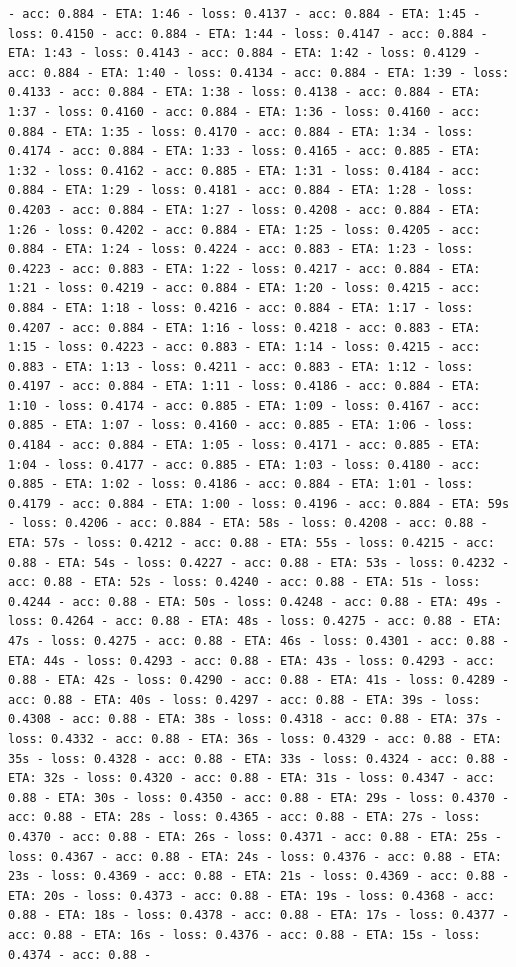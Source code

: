 \documentclass[11pt]{article}
\begin{document}
\begin{Verbatim}[commandchars=\\\{\}]
- acc: 0.884 - ETA: 1:46 - loss: 0.4137 - acc: 0.884 - ETA: 1:45 - loss: 0.4150 - acc: 0.884 - ETA: 1:44 - loss: 0.4147 - acc: 0.884 - ETA: 1:43 - loss: 0.4143 - acc: 0.884 - ETA: 1:42 - loss: 0.4129 - acc: 0.884 - ETA: 1:40 - loss: 0.4134 - acc: 0.884 - ETA: 1:39 - loss: 0.4133 - acc: 0.884 - ETA: 1:38 - loss: 0.4138 - acc: 0.884 - ETA: 1:37 - loss: 0.4160 - acc: 0.884 - ETA: 1:36 - loss: 0.4160 - acc: 0.884 - ETA: 1:35 - loss: 0.4170 - acc: 0.884 - ETA: 1:34 - loss: 0.4174 - acc: 0.884 - ETA: 1:33 - loss: 0.4165 - acc: 0.885 - ETA: 1:32 - loss: 0.4162 - acc: 0.885 - ETA: 1:31 - loss: 0.4184 - acc: 0.884 - ETA: 1:29 - loss: 0.4181 - acc: 0.884 - ETA: 1:28 - loss: 0.4203 - acc: 0.884 - ETA: 1:27 - loss: 0.4208 - acc: 0.884 - ETA: 1:26 - loss: 0.4202 - acc: 0.884 - ETA: 1:25 - loss: 0.4205 - acc: 0.884 - ETA: 1:24 - loss: 0.4224 - acc: 0.883 - ETA: 1:23 - loss: 0.4223 - acc: 0.883 - ETA: 1:22 - loss: 0.4217 - acc: 0.884 - ETA: 1:21 - loss: 0.4219 - acc: 0.884 - ETA: 1:20 - loss: 0.4215 - acc: 0.884 - ETA: 1:18 - loss: 0.4216 - acc: 0.884 - ETA: 1:17 - loss: 0.4207 - acc: 0.884 - ETA: 1:16 - loss: 0.4218 - acc: 0.883 - ETA: 1:15 - loss: 0.4223 - acc: 0.883 - ETA: 1:14 - loss: 0.4215 - acc: 0.883 - ETA: 1:13 - loss: 0.4211 - acc: 0.883 - ETA: 1:12 - loss: 0.4197 - acc: 0.884 - ETA: 1:11 - loss: 0.4186 - acc: 0.884 - ETA: 1:10 - loss: 0.4174 - acc: 0.885 - ETA: 1:09 - loss: 0.4167 - acc: 0.885 - ETA: 1:07 - loss: 0.4160 - acc: 0.885 - ETA: 1:06 - loss: 0.4184 - acc: 0.884 - ETA: 1:05 - loss: 0.4171 - acc: 0.885 - ETA: 1:04 - loss: 0.4177 - acc: 0.885 - ETA: 1:03 - loss: 0.4180 - acc: 0.885 - ETA: 1:02 - loss: 0.4186 - acc: 0.884 - ETA: 1:01 - loss: 0.4179 - acc: 0.884 - ETA: 1:00 - loss: 0.4196 - acc: 0.884 - ETA: 59s - loss: 0.4206 - acc: 0.884 - ETA: 58s - loss: 0.4208 - acc: 0.88 - ETA: 57s - loss: 0.4212 - acc: 0.88 - ETA: 55s - loss: 0.4215 - acc: 0.88 - ETA: 54s - loss: 0.4227 - acc: 0.88 - ETA: 53s - loss: 0.4232 - acc: 0.88 - ETA: 52s - loss: 0.4240 - acc: 0.88 - ETA: 51s - loss: 0.4244 - acc: 0.88 - ETA: 50s - loss: 0.4248 - acc: 0.88 - ETA: 49s - loss: 0.4264 - acc: 0.88 - ETA: 48s - loss: 0.4275 - acc: 0.88 - ETA: 47s - loss: 0.4275 - acc: 0.88 - ETA: 46s - loss: 0.4301 - acc: 0.88 - ETA: 44s - loss: 0.4293 - acc: 0.88 - ETA: 43s - loss: 0.4293 - acc: 0.88 - ETA: 42s - loss: 0.4290 - acc: 0.88 - ETA: 41s - loss: 0.4289 - acc: 0.88 - ETA: 40s - loss: 0.4297 - acc: 0.88 - ETA: 39s - loss: 0.4308 - acc: 0.88 - ETA: 38s - loss: 0.4318 - acc: 0.88 - ETA: 37s - loss: 0.4332 - acc: 0.88 - ETA: 36s - loss: 0.4329 - acc: 0.88 - ETA: 35s - loss: 0.4328 - acc: 0.88 - ETA: 33s - loss: 0.4324 - acc: 0.88 - ETA: 32s - loss: 0.4320 - acc: 0.88 - ETA: 31s - loss: 0.4347 - acc: 0.88 - ETA: 30s - loss: 0.4350 - acc: 0.88 - ETA: 29s - loss: 0.4370 - acc: 0.88 - ETA: 28s - loss: 0.4365 - acc: 0.88 - ETA: 27s - loss: 0.4370 - acc: 0.88 - ETA: 26s - loss: 0.4371 - acc: 0.88 - ETA: 25s - loss: 0.4367 - acc: 0.88 - ETA: 24s - loss: 0.4376 - acc: 0.88 - ETA: 23s - loss: 0.4369 - acc: 0.88 - ETA: 21s - loss: 0.4369 - acc: 0.88 - ETA: 20s - loss: 0.4373 - acc: 0.88 - ETA: 19s - loss: 0.4368 - acc: 0.88 - ETA: 18s - loss: 0.4378 - acc: 0.88 - ETA: 17s - loss: 0.4377 - acc: 0.88 - ETA: 16s - loss: 0.4376 - acc: 0.88 - ETA: 15s - loss: 0.4374 - acc: 0.88 - 
\end{Verbatim}
\end{document}
